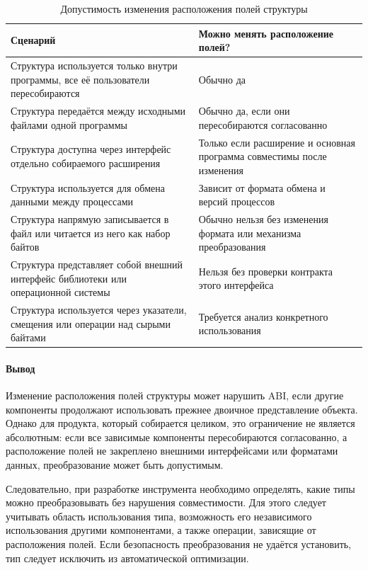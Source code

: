 \documentclass[a4paper,12pt]{article}
\begin{document}
\begin{table}[htbp]
  \centering
  \caption{Допустимость изменения расположения полей структуры}
  \label{tab:struct-layout}
  \small
  \renewcommand{\arraystretch}{1.3}
  \begin{tabularx}{\textwidth}{@{}%
      >{\RaggedRight\arraybackslash}X%
      >{\RaggedRight\arraybackslash}p{}@{}}
    \toprule
    \textbf{Сценарий} & \textbf{Можно менять расположение полей?} \\
    \midrule
    Структура используется только внутри программы, все её пользователи
      пересобираются
      & Обычно да \\
    Структура передаётся между исходными файлами одной программы
      & Обычно да, если они пересобираются согласованно \\
    Структура доступна через интерфейс отдельно собираемого расширения
      & Только если расширение и основная программа совместимы после изменения \\
    Структура используется для обмена данными между процессами
      & Зависит от формата обмена и версий процессов \\
    Структура напрямую записывается в файл или читается из него как набор байтов
      & Обычно нельзя без изменения формата или механизма преобразования \\
    Структура представляет собой внешний интерфейс библиотеки
      или операционной системы
      & Нельзя без проверки контракта этого интерфейса \\
    Структура используется через указатели, смещения или операции
      над сырыми байтами
      & Требуется анализ конкретного использования \\
    \bottomrule
  \end{tabularx}
\end{table}

\paragraph{Вывод}
Изменение расположения полей структуры может нарушить ABI, если другие компоненты продолжают использовать прежнее двоичное представление объекта. Однако для продукта, который собирается целиком, это ограничение не является абсолютным: если все зависимые компоненты пересобираются согласованно, а расположение полей не закреплено внешними интерфейсами или форматами данных, преобразование может быть допустимым.

Следовательно, при разработке инструмента необходимо определять, какие типы можно преобразовывать без нарушения совместимости. Для этого следует учитывать область использования типа, возможность его независимого использования другими компонентами, а также операции, зависящие от расположения полей. Если безопасность преобразования не удаётся установить, тип следует исключить из автоматической оптимизации.
\end{document}
